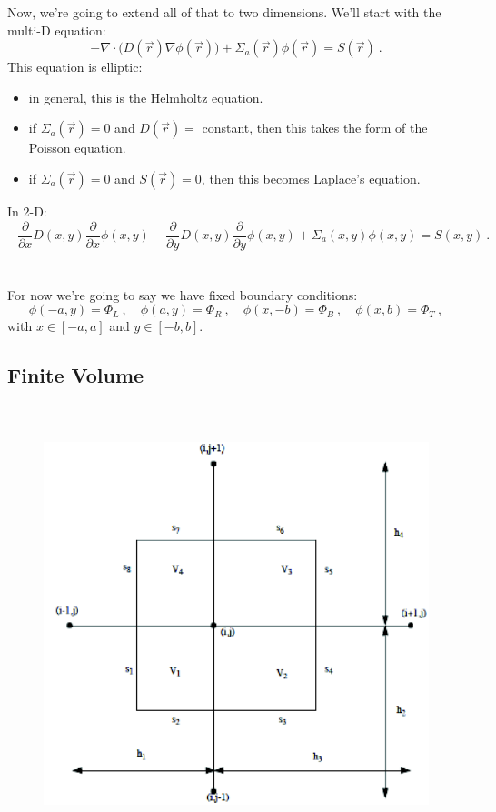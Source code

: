 \documentclass[12pt]{exam}
\begin{document}
Now, we're going to extend all of that to two dimensions. We'll start with the multi-D equation:
\[-\nabla \cdot \bigl(D(\vec{r})\nabla \phi(\vec{r})\bigr) + \Sigma_a(\vec{r}) \phi(\vec{r}) = S(\vec{r})\:.\]
%
This equation is elliptic:
\begin{itemize}
\item in general, this is the Helmholtz equation.
\item if $\Sigma_a(\vec{r})=0$ and $D(\vec{r})=$ constant, then this takes the form of the Poisson equation.
\item if $\Sigma_a(\vec{r})=0$ and $S(\vec{r})=0$, then this becomes Laplace's equation. 
\end{itemize}

In 2-D:
\ifprintanswers
\[-\frac{\partial}{\partial x}D(x,y)\frac{\partial}{\partial x} \phi(x,y) -\frac{\partial}{\partial y}D(x,y)\frac{\partial}{\partial y} \phi(x,y) + \Sigma_a(x,y) \phi(x,y) = S(x,y)\:.\]
\else
\\ \vspace*{2em} \\
%
For now we're going to say we have fixed boundary conditions:
\[\phi(-a,y) = \Phi_L\:, \quad \phi(a,y) = \Phi_R\:, \quad \phi(x,-b) = \Phi_B\:, \quad \phi(x,b) = \Phi_T\:,\]
with $x \in [-a,a]$ and $y \in [-b,b]$.


\subsection*{Finite Volume}

\begin{figure}[h!]
\begin{center}
\includegraphics[height=5in]{../figs/2DfvmGrid}
\end{center}
\end{figure}
\end{document}
